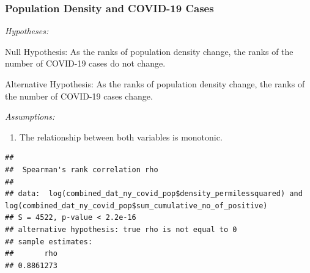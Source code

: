 \documentclass[
  12pt,
]{article}
\newenvironment{Shaded}{\begin{snugshade}}{\end{snugshade}}
\newcommand{\AttributeTok}[1]{\textcolor[rgb]{0.77,0.63,0.00}{#1}}
\newcommand{\CommentTok}[1]{\textcolor[rgb]{0.56,0.35,0.01}{\textit{#1}}}
\newcommand{\FunctionTok}[1]{\textcolor[rgb]{0.00,0.00,0.00}{#1}}
\newcommand{\NormalTok}[1]{#1}
\newcommand{\OtherTok}[1]{\textcolor[rgb]{0.56,0.35,0.01}{#1}}
\newcommand{\SpecialCharTok}[1]{\textcolor[rgb]{0.00,0.00,0.00}{#1}}
\newcommand{\StringTok}[1]{\textcolor[rgb]{0.31,0.60,0.02}{#1}}
\providecommand{\tightlist}{%
  \setlength{\itemsep}{0pt}\setlength{\parskip}{0pt}}
\begin{document}
\hypertarget{population-density-and-covid-19-cases}{%
\subsubsection{Population Density and COVID-19
Cases}\label{population-density-and-covid-19-cases}}

\emph{Hypotheses:}

Null Hypothesis: As the ranks of population density change, the ranks of
the number of COVID-19 cases do not change.

Alternative Hypothesis: As the ranks of population density change, the
ranks of the number of COVID-19 cases change.

\emph{Assumptions:}

\begin{enumerate}
\def\labelenumi{\arabic{enumi}.}
\tightlist
\item
  The relationship between both variables is monotonic.
\end{enumerate}

\begin{Shaded}
\end{Shaded}

\begin{verbatim}
## 
##  Spearman's rank correlation rho
## 
## data:  log(combined_dat_ny_covid_pop$density_permilessquared) and log(combined_dat_ny_covid_pop$sum_cumulative_no_of_positive)
## S = 4522, p-value < 2.2e-16
## alternative hypothesis: true rho is not equal to 0
## sample estimates:
##       rho 
## 0.8861273
\end{verbatim}
\end{document}
